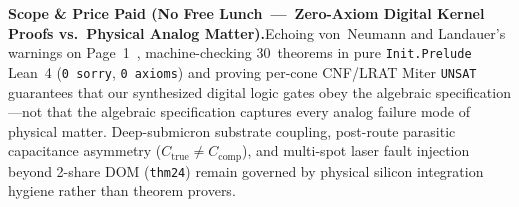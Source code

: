 \documentclass[10pt,twocolumn]{article}
\providecommand{\LeanTheoremTotal}{30}
\theoremstyle{spectralthm}
\begin{document}
\par\medskip\noindent\textbf{Scope \& Price Paid (No Free Lunch~---~Zero-Axiom Digital Kernel Proofs vs.\ Physical Analog Matter).}\;Echoing von~Neumann and Landauer's warnings on Page~1~\cite{landauer1961irreversibility}, machine-checking \LeanTheoremTotal\ theorems in pure \texttt{Init.Prelude} Lean~4 (\texttt{0 sorry}, \texttt{0 axioms}) and proving per-cone CNF/LRAT Miter \texttt{UNSAT} guarantees that our synthesized digital logic gates obey the algebraic specification---not that the algebraic specification captures every analog failure mode of physical matter. Deep-submicron substrate coupling, post-route parasitic capacitance asymmetry ($C_{\mathrm{true}} \neq C_{\mathrm{comp}}$), and multi-spot laser fault injection beyond 2-share DOM (\texttt{thm24}) remain governed by physical silicon integration hygiene rather than theorem provers.
\end{document}
